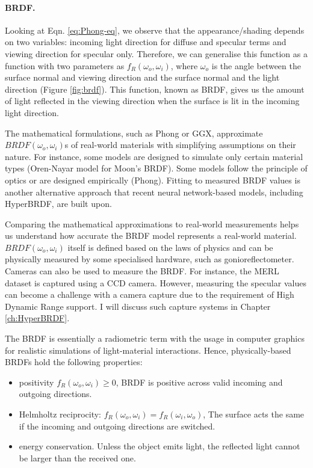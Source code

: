 \paragraph{BRDF.} 
Looking at Eqn. \ref{eq:Phong-eq}, we observe that the appearance/shading depends on two variables: incoming light direction for diffuse and specular terms and viewing direction for specular only. Therefore, we can generalise this function as a function with two parameters as  $f_R(\omega_o, \omega_i)$, where  $\omega_o$ is the angle between the surface normal and viewing direction and the surface normal and the light direction (Figure \ref{fig:brdf}). This function, known as BRDF, gives us the amount of light reflected in the viewing direction when the surface is lit in the incoming light direction.

The mathematical formulations, such as Phong or GGX, approximate $BRDF(\omega_o, \omega_i)$s of real-world materials with simplifying assumptions on their nature. For instance, some models are designed to simulate only certain material types (Oren-Nayar model for Moon's BRDF). Some models follow the principle of optics or are designed empirically (Phong). Fitting to measured BRDF values is another alternative approach that recent neural network-based models, including HyperBRDF, are built upon.  

Comparing the mathematical approximations to real-world measurements helps us understand how accurate the BRDF model represents a real-world material. $BRDF(\omega_o, \omega_i)$ itself is defined based on the laws of physics and can be physically measured by some specialised hardware, such as gonioreflectometer. Cameras can also be used to measure the BRDF. For instance, the MERL dataset \cite{Matusik2003jul} is captured using a CCD camera. However, measuring the specular values can become a challenge with a camera capture due to the requirement of High Dynamic Range support. I will discuss such capture systems in Chapter \ref{ch:HyperBRDF}.

The BRDF is essentially a radiometric term with the usage in computer graphics for realistic simulations of light-material interactions. Hence, physically-based BRDFs hold the following properties:
\begin{itemize}
  \item positivity $f_R(\omega_o, \omega_i) \geq 0$, BRDF is positive across valid incoming and outgoing directions.
  \item Helmholtz reciprocity: $f_R(\omega_o, \omega_i) = f_R(\omega_i, \omega_o)$, The surface acts the same if the incoming and outgoing directions are switched.
  \item energy conservation. Unless the object emits light, the reflected light cannot be larger than the received one.
\end{itemize}


